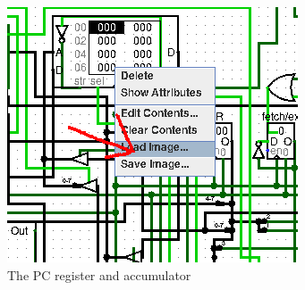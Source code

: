 \documentclass{article}
\begin{document}
\begin{figure}[h]
	\centering
	\begin{subfigure}{0.2\textwidth}
		\centering
		\includegraphics[width=\textwidth]{load image.png}
		\caption{The PC register and accumulator\label{PC}}
	\end{subfigure}\hfill
	\begin{subfigure}{0.1\textwidth}
		\centering

\end{subfigure}
\end{figure}
\end{document}
